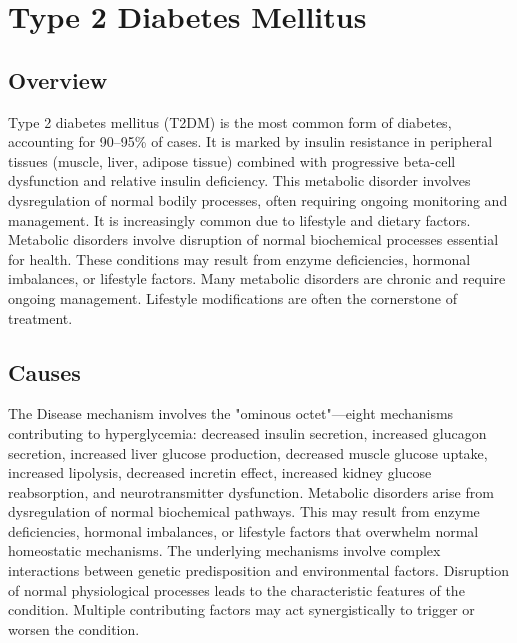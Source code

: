 \chapter{Type 2 Diabetes Mellitus}
\label{sec:Type 2 Diabetes Mellitus}

\section{Overview}
Type 2 diabetes mellitus (T2DM) is the most common form of diabetes, accounting for 90--95\% of cases. It is marked by insulin resistance in peripheral tissues (muscle, liver, adipose tissue) combined with progressive beta-cell dysfunction and relative insulin deficiency. This metabolic disorder involves dysregulation of normal bodily processes, often requiring ongoing monitoring and management. It is increasingly common due to lifestyle and dietary factors. Metabolic disorders involve disruption of normal biochemical processes essential for health. These conditions may result from enzyme deficiencies, hormonal imbalances, or lifestyle factors. Many metabolic disorders are chronic and require ongoing management. Lifestyle modifications are often the cornerstone of treatment.
\section{Causes}
The Disease mechanism involves the "ominous octet"---eight mechanisms contributing to hyperglycemia: decreased insulin secretion, increased glucagon secretion, increased liver glucose production, decreased muscle glucose uptake, increased lipolysis, decreased incretin effect, increased kidney glucose reabsorption, and neurotransmitter dysfunction. Metabolic disorders arise from dysregulation of normal biochemical pathways. This may result from enzyme deficiencies, hormonal imbalances, or lifestyle factors that overwhelm normal homeostatic mechanisms. The underlying mechanisms involve complex interactions between genetic predisposition and environmental factors. Disruption of normal physiological processes leads to the characteristic features of the condition. Multiple contributing factors may act synergistically to trigger or worsen the condition.

